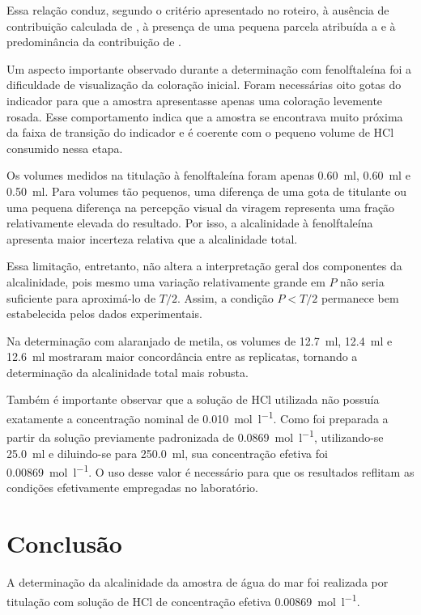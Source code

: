\documentclass[a4paper,12pt]{article}
\begin{document}
Essa relação conduz, segundo o critério apresentado no roteiro, à ausência
de contribuição calculada de , à presença de uma pequena parcela
atribuída a  e à predominância da contribuição de
.

Um aspecto importante observado durante a determinação com fenolftaleína
foi a dificuldade de visualização da coloração inicial. Foram necessárias
oito gotas do indicador para que a amostra apresentasse apenas uma
coloração levemente rosada. Esse comportamento indica que a amostra se
encontrava muito próxima da faixa de transição do indicador e é coerente
com o pequeno volume de HCl consumido nessa etapa.

Os volumes medidos na titulação à fenolftaleína foram apenas
\qty{0.60}{\milli\litre}, \qty{0.60}{\milli\litre} e
\qty{0.50}{\milli\litre}. Para volumes tão pequenos, uma diferença de uma
gota de titulante ou uma pequena diferença na percepção visual da viragem
representa uma fração relativamente elevada do resultado. Por isso, a
alcalinidade à fenolftaleína apresenta maior incerteza relativa que a
alcalinidade total.

Essa limitação, entretanto, não altera a interpretação geral dos
componentes da alcalinidade, pois mesmo uma variação relativamente grande
em $P$ não seria suficiente para aproximá-lo de $T/2$. Assim, a condição
$P<T/2$ permanece bem estabelecida pelos dados experimentais.

Na determinação com alaranjado de metila, os volumes de
\qty{12.7}{\milli\litre}, \qty{12.4}{\milli\litre} e
\qty{12.6}{\milli\litre} mostraram maior concordância entre as replicatas,
tornando a determinação da alcalinidade total mais robusta.

Também é importante observar que a solução de HCl utilizada não possuía
exatamente a concentração nominal de \qty{0.010}{\mole\per\litre}.
Como foi preparada a partir da solução previamente padronizada de
\qty{0.0869}{\mole\per\litre}, utilizando-se
\qty{25.0}{\milli\litre} e diluindo-se para
\qty{250.0}{\milli\litre}, sua concentração efetiva foi
\qty{0.00869}{\mole\per\litre}. O uso desse valor é necessário para que os
resultados reflitam as condições efetivamente empregadas no laboratório.

\section{Conclusão}

A determinação da alcalinidade da amostra de água do mar foi realizada por
titulação com solução de HCl de concentração efetiva
\qty{0.00869}{\mole\per\litre}.
\end{document}
